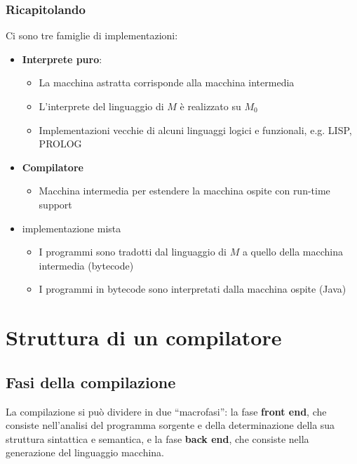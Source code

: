 \documentclass[a4paper,10pt]{article}
\begin{document}
\subsubsection{Ricapitolando}
Ci sono tre famiglie di implementazioni:
\begin{itemize}
 \item \textbf{Interprete puro}:
 \begin{itemize}
  \item La macchina astratta corrisponde alla macchina intermedia
  \item L'interprete del linguaggio di $M$ è realizzato su $M_0$
  \item Implementazioni vecchie di alcuni linguaggi logici e funzionali, e.g. LISP, PROLOG
 \end{itemize}
 \item \textbf{Compilatore}
\begin{itemize}
 \item Macchina intermedia per estendere la macchina ospite con run-time support
\end{itemize}
\item implementazione mista
\begin{itemize}
 \item I programmi sono tradotti dal linguaggio di $M$ a quello della macchina intermedia (bytecode)
 \item I programmi in bytecode sono interpretati dalla macchina ospite (Java)
\end{itemize}
\end{itemize}
\newpage
\section{Struttura di un compilatore}
\subsection{Fasi della compilazione}
La compilazione si può dividere in due ``macrofasi'': la fase \textbf{front end}, che consiste nell'analisi del programma sorgente e della determinazione della sua struttura sintattica e semantica, e la fase \textbf{back end}, che consiste nella generazione del linguaggio macchina.\smallskip
\end{document}
